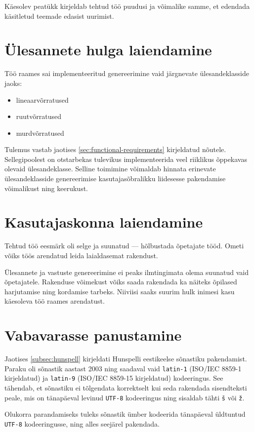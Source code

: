 Käesolev peatükk kirjeldab tehtud töö puudusi ja võimalike samme, et edendada käsitletud teemade edasist uurimist.

\section{Ülesannete hulga laiendamine}

Töö raames sai implementeeritud genereerimine vaid järgnevate ülesandeklasside jaoks:

\begin{itemize}
  \item lineaarvõrratused
  \item ruutvõrratused
  \item murdvõrratused
\end{itemize}

Tulemus vastab jaotises \ref{sec:functional-requirements} kirjeldatud nõutele. Sellegipoolest on otstarbekas tulevikus implementeerida veel riiklikus õppekavas olevaid ülesandeklasse. Selline toimimine võimaldab hinnata erinevate ülesandeklasside genereerimise kasutajasõbralikku liidesesse pakendamise võimalikust ning keerukust.

\section{Kasutajaskonna laiendamine}

Tehtud töö eesmärk oli selge ja suunatud — hõlbustada õpetajate tööd. Ometi võiks töös arendatud leida laialdasemat rakendust.

Ülesannete ja vastuste genereerimine ei peaks ilmtingimata olema suunatud vaid õpetajatele. Rakenduse võimekust võiks saada rakendada ka näiteks õpilased harjutamise ning kordamise tarbeks. Niiviisi saaks suurim hulk inimesi kasu käesoleva töö raames arendatust.


\section{Vabavarasse panustamine}

Jaotises \ref{subsec:hunspell} kirjeldati Hunspelli eestikeelse sõnastiku pakendamist. Paraku oli sõnastik aastast 2003 ning saadaval vaid \texttt{latin-1} (ISO/IEC 8859-1 kirjeldatud) ja \texttt{latin-9} (ISO/IEC 8859-15 kirjeldatud) kodeeringus. See tähendab, et sõnastiku ei tõlgendata korrektselt kui seda rakendada sisendteksti peale, mis on tänapäeval levinud \texttt{UTF-8} kodeeringus ning sisaldab tähti \texttt{š} või \texttt{ž}.

Olukorra parandamiseks tuleks sõnastik ümber kodeerida tänapäeval üldtuntud \texttt{UTF-8} kodeeringusse, ning alles seejärel pakendada.

